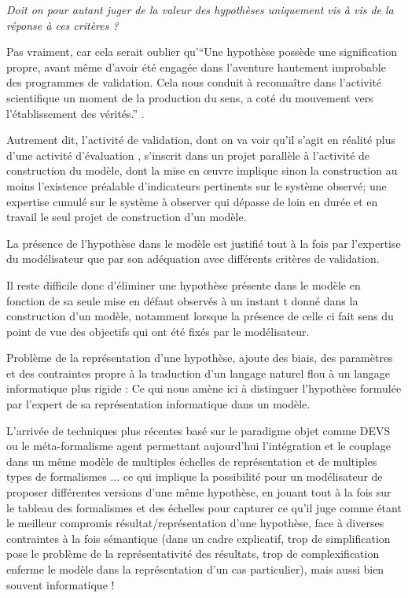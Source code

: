 \textit{Doit on pour autant juger de la valeur des hypothèses uniquement vis à vis de la réponse à ces critères ?}

Pas vraiment, car cela serait oublier qu'\enquote{Une hypothèse possède une signification propre, avant même d’avoir été engagée dans l’aventure hautement improbable des programmes de validation. Cela nous conduit à reconnaître dans l’activité scientifique un moment de la production du sens, a coté du mouvement vers l’établissement des vérités.} \autocite[17]{Besse2000}.

Autrement dit, l'activité de validation, dont on va voir qu'il s'agit en réalité plus d'une activité d'évaluation \autocite{Amblard2006}, s'inscrit dans un projet parallèle à l'activité de construction du modèle, dont la mise en œuvre implique sinon la construction au moins l'existence préalable d'indicateurs pertinents sur le système observé; une expertise cumulé sur le système à observer qui dépasse de loin en durée et en travail le seul projet de construction d'un modèle.


La présence de l'hypothèse dans le modèle est justifié tout à la fois par l'expertise du modélisateur que par son adéquation avec différents critères de validation.

Il reste difficile donc d'éliminer une hypothèse présente dans le modèle en fonction de sa seule mise en défaut observés à un instant t donné dans la construction d'un modèle, notamment lorsque la présence de celle ci fait sens du point de vue des objectifs qui ont été fixés par le modélisateur.

Problème de la représentation d'une hypothèse, ajoute des biais, des paramètres et des contraintes propre à la traduction d'un langage naturel flou à un langage informatique plus rigide : Ce qui nous amène ici à distinguer l'hypothèse formulée par l'expert de sa représentation informatique dans un modèle.

L'arrivée de techniques plus récentes basé sur le paradigme objet comme DEVS ou le méta-formalisme agent permettant aujourd'hui l'intégration et le couplage dans un même modèle de multiples échelles de représentation et de multiples types de formalismes ... ce qui implique la possibilité pour un modélisateur de proposer différentes versions d'une même hypothèse, en jouant tout à la fois sur le tableau des formalismes et des échelles pour capturer ce qu'il juge comme étant le meilleur compromis résultat/représentation d'une hypothèse, face à diverses contraintes à la fois sémantique (dans un cadre explicatif, trop de simplification pose le problème de la représentativité des résultats, trop de complexification enferme le modèle dans la représentation d'un cas particulier),  mais aussi bien souvent informatique !





